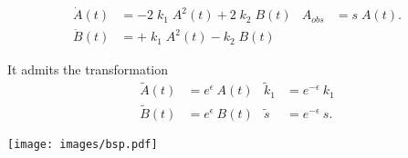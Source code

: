 \documentclass[portrait,final, fontscale=.34]{baposter}
\begin{document}
\begin{poster}
{\vspace{-10pt}
\begin{align*}
	\dot{A}(t) &= -2\;k_1\;A^2(t) + 2\;k_2\;B(t) & A_{obs} &= s\;A(t).\\
	\dot{B}(t) &= +\;k_1\;A^2(t) - k_2\;B(t)	
\end{align*}

It admits the transformation
\begin{align*}
	\tilde{A}(t) &= e^{\epsilon} \: A(t) & \tilde{k}_1 &= e^{-\epsilon}\: k_1\\
	\tilde{B}(t) &= e^{\epsilon} \: B(t) & \tilde{s} &= e^{-\epsilon}\: s.
\end{align*}

\begin{center}{\texttt{[image: images/bsp.pdf]}}\end{center}

    }


\end{poster}
\end{document}
